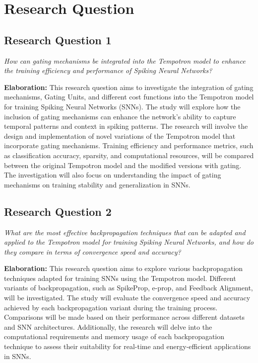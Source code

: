 \chapter{Research Question}
\label{chap:rq}

\section*{Research Question 1}
\textit{How can gating mechanisms be integrated into the Tempotron model to enhance the training efficiency and performance of Spiking Neural Networks?}

\textbf{Elaboration:}
This research question aims to investigate the integration of gating mechanisms, Gating Units, and different cost functions into the Tempotron model for training Spiking Neural Networks (SNNs). The study will explore how the inclusion of gating mechanisms can enhance the network's ability to capture temporal patterns and context in spiking patterns. The research will involve the design and implementation of novel variations of the Tempotron model that incorporate gating mechanisms. Training efficiency and performance metrics, such as classification accuracy, sparsity, and computational resources, will be compared between the original Tempotron model and the modified versions with gating. The investigation will also focus on understanding the impact of gating mechanisms on training stability and generalization in SNNs.

\section*{Research Question 2}
\textit{What are the most effective backpropagation techniques that can be adapted and applied to the Tempotron model for training Spiking Neural Networks, and how do they compare in terms of convergence speed and accuracy?}

\textbf{Elaboration:}
This research question aims to explore various backpropagation techniques adapted for training SNNs using the Tempotron model. Different variants of backpropagation, such as SpikeProp, e-prop, and Feedback Alignment, will be investigated. The study will evaluate the convergence speed and accuracy achieved by each backpropagation variant during the training process. Comparisons will be made based on their performance across different datasets and SNN architectures. Additionally, the research will delve into the computational requirements and memory usage of each backpropagation technique to assess their suitability for real-time and energy-efficient applications in SNNs.

